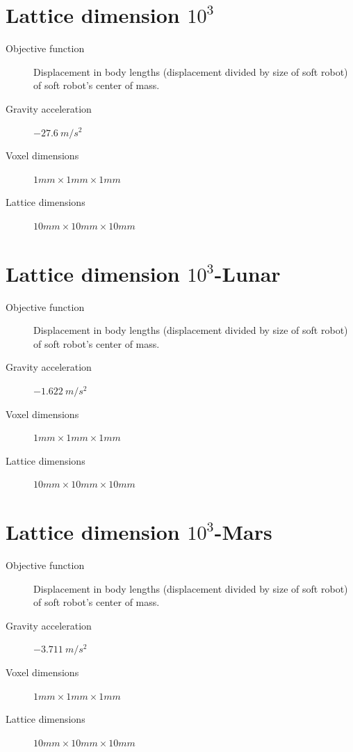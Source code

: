 \section{Lattice dimension $10^3$}
\label{Settings-size10}
\begin{small}
\begin{description}
\item[Objective function]{Displacement in body lengths (displacement divided by size of soft robot) of soft robot's center of mass.}
\item[Gravity acceleration]{$-27.6\ m/s^2$}
\item[Voxel dimensions]{$1mm \times 1mm \times 1mm$}
\item[Lattice dimensions]{$10mm \times 10mm \times 10mm$}
\end{description}
\end{small}

\section{Lattice dimension $10^3$-Lunar}
\label{Settings-size10-moon}
\begin{small}
\begin{description}
\item[Objective function]{Displacement in body lengths (displacement divided by size of soft robot) of soft robot's center of mass.}
\item[Gravity acceleration]{$-1.622\ m/s^2$}
\item[Voxel dimensions]{$1mm \times 1mm \times 1mm$}
\item[Lattice dimensions]{$10mm \times 10mm \times 10mm$}
\end{description}
\end{small}

\section{Lattice dimension $10^3$-Mars}
\label{Settings-size10-mars}
\begin{small}
\begin{description}
\item[Objective function]{Displacement in body lengths (displacement divided by size of soft robot) of soft robot's center of mass.}
\item[Gravity acceleration]{$-3.711\ m/s^2$}
\item[Voxel dimensions]{$1mm \times 1mm \times 1mm$}
\item[Lattice dimensions]{$10mm \times 10mm \times 10mm$}
\end{description}
\end{small}

